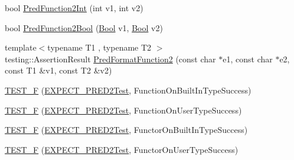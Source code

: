 \begin{DoxyCompactItemize}
\item 
bool \mbox{\hyperlink{_obj__test_2lib_2googletest-master_2googletest_2test_2gtest__pred__impl__unittest_8cc_a7a3b834b08a5176afbd4bfc97d06bedd}{Pred\+Function2\+Int}} (int v1, int v2)
\item 
bool \mbox{\hyperlink{_obj__test_2lib_2googletest-master_2googletest_2test_2gtest__pred__impl__unittest_8cc_ab00487cdc08174c122cfaccc6abf221d}{Pred\+Function2\+Bool}} (\mbox{\hyperlink{struct_bool}{Bool}} v1, \mbox{\hyperlink{struct_bool}{Bool}} v2)
\item 
{\footnotesize template$<$typename T1 , typename T2 $>$ }\\testing\+::\+Assertion\+Result \mbox{\hyperlink{_obj__test_2lib_2googletest-master_2googletest_2test_2gtest__pred__impl__unittest_8cc_ac47f2d44062a47c907d113375ec47d47}{Pred\+Format\+Function2}} (const char $\ast$e1, const char $\ast$e2, const T1 \&v1, const T2 \&v2)
\item 
\mbox{\hyperlink{_obj__test_2lib_2googletest-master_2googletest_2test_2gtest__pred__impl__unittest_8cc_aba0b6cfb33acecfb0ab3092f2194f958}{T\+E\+S\+T\+\_\+F}} (\mbox{\hyperlink{googletest-master_2googletest_2test_2gtest__pred__impl__unittest_8cc_a232826190f0ba7ce5dffa1ced1219acc}{E\+X\+P\+E\+C\+T\+\_\+\+P\+R\+E\+D2\+Test}}, Function\+On\+Built\+In\+Type\+Success)
\item 
\mbox{\hyperlink{_obj__test_2lib_2googletest-master_2googletest_2test_2gtest__pred__impl__unittest_8cc_a6c5a246f545dedba3863fc60fdcec435}{T\+E\+S\+T\+\_\+F}} (\mbox{\hyperlink{googletest-master_2googletest_2test_2gtest__pred__impl__unittest_8cc_a232826190f0ba7ce5dffa1ced1219acc}{E\+X\+P\+E\+C\+T\+\_\+\+P\+R\+E\+D2\+Test}}, Function\+On\+User\+Type\+Success)
\item 
\mbox{\hyperlink{_obj__test_2lib_2googletest-master_2googletest_2test_2gtest__pred__impl__unittest_8cc_a512e6b394b152d77349f5b884043710c}{T\+E\+S\+T\+\_\+F}} (\mbox{\hyperlink{googletest-master_2googletest_2test_2gtest__pred__impl__unittest_8cc_a232826190f0ba7ce5dffa1ced1219acc}{E\+X\+P\+E\+C\+T\+\_\+\+P\+R\+E\+D2\+Test}}, Functor\+On\+Built\+In\+Type\+Success)
\item 
\mbox{\hyperlink{_obj__test_2lib_2googletest-master_2googletest_2test_2gtest__pred__impl__unittest_8cc_a4ce1ae190c7b5477db170623d18ea48f}{T\+E\+S\+T\+\_\+F}} (\mbox{\hyperlink{googletest-master_2googletest_2test_2gtest__pred__impl__unittest_8cc_a232826190f0ba7ce5dffa1ced1219acc}{E\+X\+P\+E\+C\+T\+\_\+\+P\+R\+E\+D2\+Test}}, Functor\+On\+User\+Type\+Success)
\item 

\end{DoxyCompactItemize}
